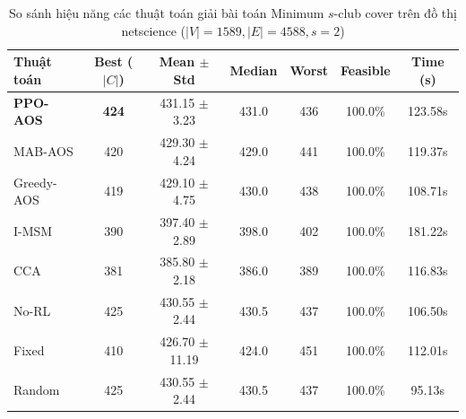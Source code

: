 \begin{table}[htbp]
\centering
\caption{So sánh hiệu năng các thuật toán giải bài toán Minimum $s$-club cover trên đồ thị netscience ($|V|=1589, |E|=4588, s=2$)}
\label{tab:results_netscience}
\begin{tabular}{lcccccc}
\hline
\textbf{Thuật toán} & \textbf{Best ($|C|$)} & \textbf{Mean $\pm$ Std} & \textbf{Median} & \textbf{Worst} & \textbf{Feasible} & \textbf{Time (s)} \\
\hline
\textbf{PPO-AOS} & \textbf{424} & 431.15 $\pm$ 3.23 & 431.0 & 436 & 100.0\% & 123.58s \\
MAB-AOS & 420 & 429.30 $\pm$ 4.24 & 429.0 & 441 & 100.0\% & 119.37s \\
Greedy-AOS & 419 & 429.10 $\pm$ 4.75 & 430.0 & 438 & 100.0\% & 108.71s \\
I-MSM & 390 & 397.40 $\pm$ 2.89 & 398.0 & 402 & 100.0\% & 181.22s \\
CCA & 381 & 385.80 $\pm$ 2.18 & 386.0 & 389 & 100.0\% & 116.83s \\
No-RL & 425 & 430.55 $\pm$ 2.44 & 430.5 & 437 & 100.0\% & 106.50s \\
Fixed & 410 & 426.70 $\pm$ 11.19 & 424.0 & 451 & 100.0\% & 112.01s \\
Random & 425 & 430.55 $\pm$ 2.44 & 430.5 & 437 & 100.0\% & 95.13s \\
\hline
\end{tabular}
\end{table}
